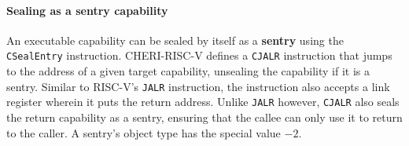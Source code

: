 \documentclass[main.tex]{subfiles}
\begin{document}
\paragraph{Sealing as a sentry capability} An executable capability can be sealed by itself as a \textbf{\gls{sentry}} using the \texttt{CSealEntry} instruction. CHERI-RISC-V defines a \texttt{CJALR} instruction that jumps to the address of a given target capability, unsealing the capability if it is a \gls{sentry}. Similar to RISC-V's \texttt{JALR} instruction, the instruction also accepts a link register wherein it puts the return address. Unlike \texttt{JALR} however, \texttt{CJALR} also seals the return capability as a \gls{sentry}, ensuring that the callee can only use it to return to the caller. A \gls{sentry}'s object type has the special value $-2$.

\biblio{}
\onlyinsubfile{\glsaddall\printglossaries}
\end{document}
